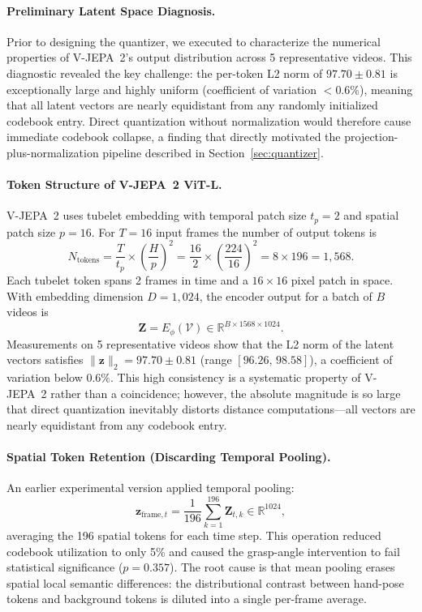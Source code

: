 \documentclass{article}
\begin{document}
\paragraph{Preliminary Latent Space Diagnosis.}
Prior to designing the quantizer, we executed
 to characterize the numerical
properties of V-JEPA~2's output distribution across 5
representative videos.  This diagnostic revealed the key
challenge: the per-token L2 norm of $97.70 \pm 0.81$ is
exceptionally large and highly uniform (coefficient of
variation $< 0.6\%$), meaning that all latent vectors are
nearly equidistant from any randomly initialized codebook
entry.  Direct quantization without normalization would
therefore cause immediate codebook collapse, a finding that
directly motivated the projection-plus-normalization pipeline
described in Section~\ref{sec:quantizer}.
\paragraph{Token Structure of V-JEPA~2 ViT-L.}
V-JEPA~2 uses tubelet embedding with temporal patch size $t_p = 2$ and spatial
patch size $p = 16$.  For $T = 16$ input frames the number of output tokens is
%
\begin{equation}
  N_{\text{tokens}}
  = \frac{T}{t_p} \times \left(\frac{H}{p}\right)^2
  = \frac{16}{2} \times \left(\frac{224}{16}\right)^2
  = 8 \times 196
  = 1{,}568.
\end{equation}
%
Each tubelet token spans 2 frames in time and a $16\times16$ pixel patch in
space.  With embedding dimension $D = 1{,}024$, the encoder output for a batch
of $B$ videos is
%
\begin{equation}
  \mathbf{Z} = E_\phi(\mathcal{V}) \in \mathbb{R}^{B \times 1568 \times 1024}.
\end{equation}
%
Measurements on 5 representative videos show that the L2 norm of the latent
vectors satisfies $\|\mathbf{z}\|_2 = 97.70 \pm 0.81$ (range
$[96.26,\,98.58]$), a coefficient of variation below $0.6\%$.  This high
consistency is a systematic property of V-JEPA~2 rather than a coincidence;
however, the absolute magnitude is so large that direct quantization inevitably
distorts distance computations---all vectors are nearly equidistant from any
codebook entry.

\paragraph{Spatial Token Retention (Discarding Temporal Pooling).}
An earlier experimental version applied temporal pooling:
%
\begin{equation}
  \mathbf{z}_{\text{frame},t}
  = \frac{1}{196}\sum_{k=1}^{196}\mathbf{Z}_{t,k}
  \in \mathbb{R}^{1024},
\end{equation}
%
averaging the 196 spatial tokens for each time step.  This operation reduced
codebook utilization to only 5\% and caused the grasp-angle intervention to
fail statistical significance ($p = 0.357$).  The root cause is that mean
pooling erases spatial local semantic differences: the distributional contrast
between hand-pose tokens and background tokens is diluted into a single
per-frame average.
\end{document}
